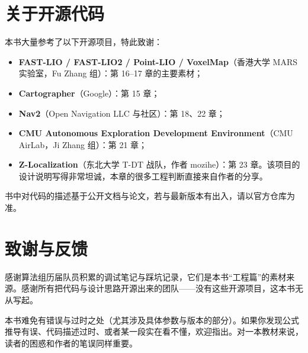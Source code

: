 \section*{关于开源代码}

本书大量参考了以下开源项目，特此致谢：
\begin{itemize}
  \item \textbf{FAST-LIO / FAST-LIO2 / Point-LIO / VoxelMap}（香港大学 MARS 实验室，Fu Zhang 组）：第 16--17 章的主要素材；
  \item \textbf{Cartographer}（Google）：第 15 章；
  \item \textbf{Nav2}（Open Navigation LLC 与社区）：第 18、22 章；
  \item \textbf{CMU Autonomous Exploration Development Environment}（CMU AirLab，Ji Zhang 组）：第 21 章；
  \item \textbf{Z-Localization}（东北大学 T-DT 战队，作者 mozihe）：第 23 章。该项目的设计说明写得非常坦诚，本章的很多工程判断直接来自作者的分享。
\end{itemize}
书中对代码的描述基于公开文档与论文，若与最新版本有出入，请以官方仓库为准。

\section*{致谢与反馈}

感谢算法组历届队员积累的调试笔记与踩坑记录，它们是本书“工程篇”的素材来源。感谢所有把代码与设计思路开源出来的团队——没有这些开源项目，这本书无从写起。

本书难免有错误与过时之处（尤其涉及具体参数与版本的部分）。如果你发现公式推导有误、代码描述过时、或者某一段实在看不懂，欢迎指出。对一本教材来说，读者的困惑和作者的笔误同样重要。

